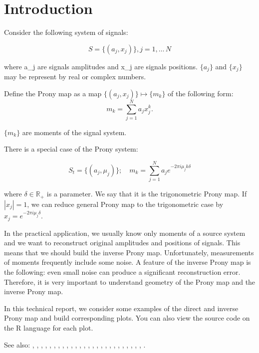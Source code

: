 \section{Introduction}

Consider the following system of signals:

$$
S = \{ (a_j, x_j) \}, j = 1, \ldots\, N
$$

where a_j are signals amplitudes and x_j are signals positions. $\{a_j\}$ and $\{x_j\}$ may be represent by real or complex numbers. \par

Define the Prony map as a map $\{ (a_j, x_j) \} \mapsto \{m_k\}$ of the following form:
$$
m_k = \sum_{j=1}^N a_j x_j^k.
$$
  
$\{m_k\}$ are moments of the signal system.

There is a special case of the Prony system:

$$
S_t = \{ (a_j, \mu_j) \}; \quad m_k = \sum_{j=1}^N a_j e^{-2\pi i \mu_j k \delta}
$$

where $\delta \in \mathbb{R}_+$ is a parameter. We say that it is the trigonometric Prony map. If $|x_j| = 1$, we can reduce general Prony map to the trigonometric case by $x_j = e^{-2\pi i \mu_j \delta}$.

In the practical application, we usually know only moments of a source system and we want to reconstruct original amplitudes and positions of signals. This means that we should build the inverse Prony map. Unfortunately, measurements of moments frequently include some noise. A feature of the inverse Prony map is the following: even small noise can produce a significant reconstruction error. Therefore, it is very important to understand geometry of the Prony map and the inverse Prony map.

In this technical report, we consider some examples of the direct and inverse Prony map and build corresponding plots. You can also view the source code on the R language for each plot.

See also: \cite{2015arXiv150206932A}, \cite{azais_spike}, \cite{batenkov_numerical_2014}, \cite{batenkov_accurate_2014}, \cite{Bat.Sar.Yom}, \cite{Bat.Yom2}, \cite{Bat.Yom.Sampta13}, \cite{Bat.Yom1}, \cite{candes_towards_2014}, \cite{candes_super-resolution_2013}, \cite{demanet_super-resolution_2013}, \cite{donoho_superresolution_1992}, \cite{Don1}, \cite{duval_exact_2013}, \cite{fernandez-granda_support_2013}, \cite{heckel_super-resolution_2014}, \cite{Lev.Ful}, \cite{liao_music_2014}, \cite{McC}, \cite{Min.Kaw.Min}, \cite{moitra_threshold_2014}, \cite{Ode.Bar.Pis}, \cite{Sle}, \cite{Yom2}, \cite{Yom1}, \cite{Dem.Ngu}, \cite{Mor.Can}.
  
  
  
  
  
  
  
  
  
  
  
  